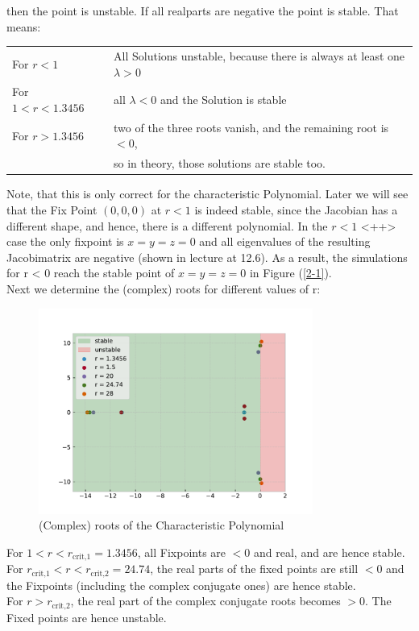 \documentclass{article}
\begin{document}
then the point is unstable. If all realparts are negative the point is stable.
That means:
\begin{table}[H]
    \centering
    \begin{tabular}{ll}
    For $ r < 1 $ & All Solutions unstable, because there is always at least
    one \( \lambda > 0 \) \\ 
    For $ 1 < r < 1.3456 $ & all \( \lambda < 0 \) and the Solution is stable \\
    For $ r > 1.3456 $ & two of the three roots vanish, and the remaining root
    is $ < 0 $, \\ & so in theory, those solutions are stable too.
    \end{tabular}
\end{table}
Note, that this is only correct for the characteristic Polynomial. Later we will
see that the Fix Point \( (0,0,0) \) at \( r < 1 \) is indeed stable, since
the Jacobian has a different shape, and hence, there is a different polynomial.
In the \( r < 1 \) <++> case the only fixpoint is $x=y=z=0$ and all eigenvalues of
the resulting Jacobimatrix are negative (shown in
lecture at 12.6). As a result, the simulations for r < 0 reach the
stable point of $x=y=z=0$ in Figure (\ref{2-1}). \\[.5cm]

Next we determine the (complex) roots for different values of r:
\begin{figure}[H]
    \centering
    \includegraphics[width=9cm]{Figure1-2.pdf} 
    \caption{(Complex) roots of the Characteristic Polynomial} 
\end{figure}
For \( 1 < r < r_\text{crit,1} = 1.3456 \), all Fixpoints are \( < 0 \) and real,
and are hence stable.\\
For \(  r_\text{crit,1} < r < r_\text{crit,2} = 24.74\), the real parts of the
fixed points are still \( < 0 \) and the Fixpoints (including the complex
conjugate ones) are hence stable. \\
For \( r > r_\text{crit,2} \), the real part of the complex conjugate roots
becomes \( > 0 \). The Fixed points are hence unstable. \\
\end{document}
